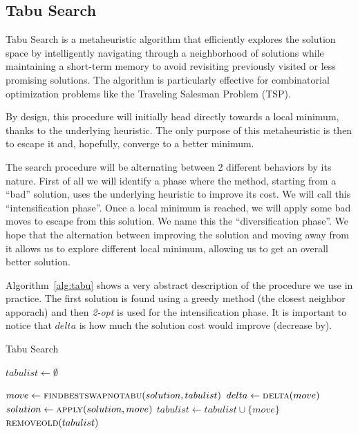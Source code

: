 \documentclass{article}
\begin{document}
\subsection{Tabu Search}
Tabu Search is a metaheuristic algorithm that efficiently explores the solution space by intelligently navigating through a neighborhood of solutions while maintaining a short-term memory to avoid revisiting previously visited or less promising solutions. The algorithm is particularly effective for combinatorial optimization problems like the Traveling Salesman Problem (TSP).

By design, this procedure will initially head directly towards a local minimum, thanks to the underlying heuristic. The only purpose of this metaheuristic is then to escape it and, hopefully, converge to a better minimum.

The search procedure will be alternating between 2 different behaviors by its nature. First of all
we will identify a phase where the method, starting from a ``bad'' solution, uses the underlying
heuristic to improve its cost. We will call this ``intensification phase''. Once a local minimum is reached, we will apply some bad moves to escape from this solution. We name this the ``diversification phase''. We hope that the alternation between improving the solution and moving
away from it allows us to explore different local minimum, allowing us to get an overall better
solution.

Algorithm~\ref{alg:tabu} shows a very abstract description of the procedure we use in practice. The first solution is found using a greedy method (the closest neighbor apporach) and then \textit{2-opt} is used for the intensification phase. It is important to notice that $delta$ is
how much the solution cost would improve (decrease by).

\begin{algorithm}[h]
\caption{Tabu Search}
\label{alg:tabu}
\begin{algorithmic}
    \State{}
    \State $tabulist \gets \emptyset$

        \State $move \gets \Call{findbestswapnotabu}{solution, tabulist}$
        \State $delta \gets \Call{delta}{move}$
        \State $solution \gets \Call{apply}{solution, move}$
          \State $tabulist \gets tabulist \cup \{move\}$
        \EndIf
        \State $\Call{removeold}{tabulist}$
    \EndWhile

  \EndProcedure

\end{algorithmic}
\end{algorithm}
\end{document}
